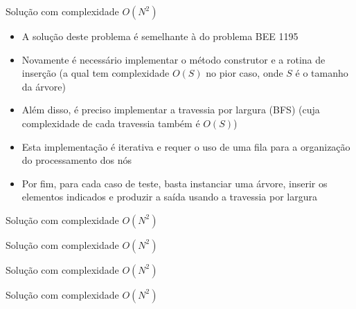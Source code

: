 \begin{frame}[fragile]{Solução com complexidade $O(N^2)$}

    \begin{itemize}
        \item A solução deste problema é semelhante à do problema BEE 1195

        \item Novamente é necessário implementar o método construtor e a rotina de inserção 
            (a qual tem
            complexidade $O(S)$ no pior caso, onde $S$ é o tamanho da árvore)

        \item Além disso, é preciso implementar a travessia por largura (BFS)
            (cuja complexidade de cada travessia também é $O(S)$)

        \item Esta implementação é iterativa e requer o uso de uma fila para a organização do
            processamento dos nós

        \item Por fim, para cada caso de teste, basta instanciar uma árvore, inserir os elementos
            indicados e produzir a saída usando a travessia por largura
   \end{itemize}

\end{frame}

\begin{frame}[fragile]{Solução com complexidade $O(N^2)$}
\end{frame}

\begin{frame}[fragile]{Solução com complexidade $O(N^2)$}
\end{frame}

\begin{frame}[fragile]{Solução com complexidade $O(N^2)$}
\end{frame}

\begin{frame}[fragile]{Solução com complexidade $O(N^2)$}
\end{frame}
